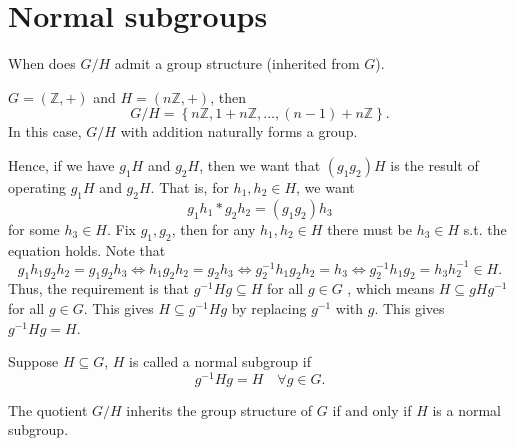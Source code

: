 \section{Normal subgroups}
\begin{question}
    When does \(G / H\) admit a group structure (inherited from \(G\)).
\end{question}

\begin{eg}
    \(G = (\mathbb{Z} , +)\) and \(H = (n\mathbb{Z} , +)\), then 
    \[
        G / H = \left\{ n\mathbb{Z} , 1 + n\mathbb{Z} , \dots , (n - 1) + n\mathbb{Z}  \right\}. 
    \]  
    In this case, \(G / H\) with addition naturally forms a group. 
\end{eg}

Hence, if we have \(g_1 H\) and \(g_2 H\), then we want that \((g_1 g_2) H\) is the result of operating \(g_1 H\) and \(g_2 H\). That is, for \(h_1, h_2 \in H\), we want 
\[
    g_1 h_1 * g_2 h_2 = (g_1 g_2) h_3
\] for some \(h_3 \in H\). Fix \(g_1, g_2\), then for any \(h_1, h_2 \in H\) there must be  \(h_3 \in H\) s.t. the equation holds. Note that 
\[
    g_1 h_1 g_2 h_2 = g_1 g_2 h_3 \iff  h_1 g_2 h_2 = g_2 h_3 \iff  g_2^{-1} h_1 g_2 h_2 = h_3 \iff g_2^{-1} h_1 g_2 = h_3 h_2^{-1} \in H.
\] Thus, the requirement is that \(g^{-1} H g \subseteq H\) for all \(g \in G\) , which means \(H \subseteq gHg^{-1} \) for all \(g \in G\). This gives \(H \subseteq g^{-1} H g\) by replacing \(g^{-1} \) with \(g\). This gives \(g^{-1} H g = H\). 

\begin{definition}
    Suppose \(H \subseteq G\), \(H\) is called a normal subgroup if 
    \[
        g^{-1} H g = H \quad \forall g \in G.
    \]
\end{definition}

\begin{theorem}
    The quotient \(G / H\) inherits the group structure of \(G\) if and only if \(H\) is a normal subgroup.   
\end{theorem}